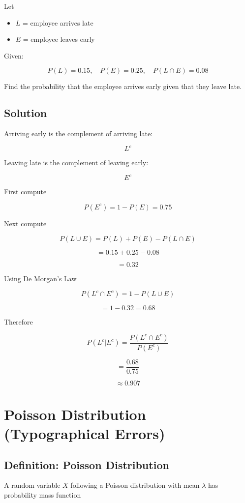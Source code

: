 \documentclass[12pt]{article}
\begin{document}
Let

\begin{itemize}
\item $L$ = employee arrives late
\item $E$ = employee leaves early
\end{itemize}

Given:

\[
P(L)=0.15, \quad P(E)=0.25, \quad P(L\cap E)=0.08
\]

Find the probability that the employee arrives early given that they leave late.

\subsection*{Solution}

Arriving early is the complement of arriving late:

\[
L^c
\]

Leaving late is the complement of leaving early:

\[
E^c
\]

First compute

\[
P(E^c)=1-P(E)=0.75
\]

Next compute

\[
P(L\cup E)=P(L)+P(E)-P(L\cap E)
\]

\[
=0.15+0.25-0.08
\]

\[
=0.32
\]

Using De Morgan's Law

\[
P(L^c\cap E^c)=1-P(L\cup E)
\]

\[
=1-0.32=0.68
\]

Therefore

\[
P(L^c|E^c)=\frac{P(L^c\cap E^c)}{P(E^c)}
\]

\[
=\frac{0.68}{0.75}
\]

\[
\approx 0.907
\]

\section{Poisson Distribution (Typographical Errors)}

\subsection*{Definition: Poisson Distribution}

A random variable $X$ following a Poisson distribution with mean $\lambda$ has probability mass function
\end{document}
